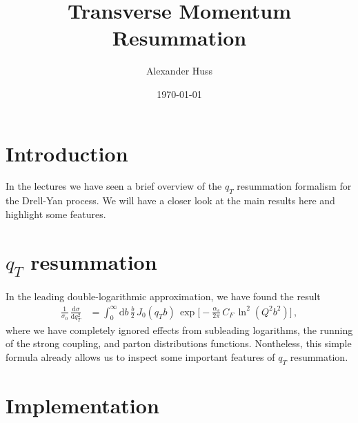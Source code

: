 \documentclass[11pt]{article}
\author{Alexander Huss}
\date{\today}
\title{Transverse Momentum Resummation}
\begin{document}
\maketitle
\tableofcontents



\section{Introduction}
\label{sec:orgb4e5498}
In the lectures we have seen a brief overview of the \(q_T\) resummation formalism for the Drell-Yan process.
We will have a closer look at the main results here and highlight some features.

\section{\(q_T\) resummation}
\label{sec:org513e602}
In the leading double-logarithmic approximation, we have found the result
\begin{align}
\label{eq:b-space}
  \frac{1}{\sigma_0}\,\frac{\mathrm{d}\sigma}{\mathrm{d}q_T^2}
  &=
  \int_0^\infty\mathrm{d}b \, \frac{b}{2} \, J_0(q_T b) \,
  \exp\Big[
    -\frac{\alpha_s}{2\pi}\, C_F \, \ln^2(Q^2 b^2)
  \Big]
  \,,
\end{align}
where we have completely ignored effects from subleading logarithms, the running of the strong coupling, and parton distributions functions.
Nontheless, this simple formula already allows us to inspect some important features of \(q_T\) resummation.


\section{Implementation}
\label{sec:orgc210a9b}
\end{document}

